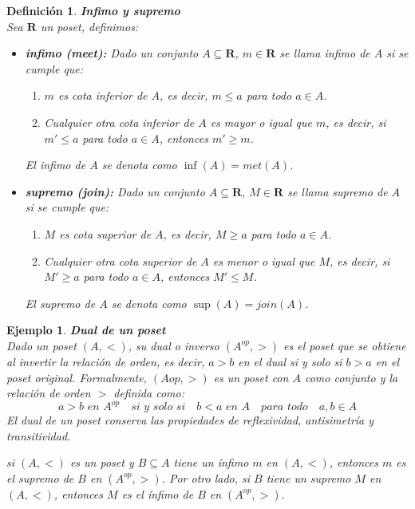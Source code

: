 \documentclass[executivepaper]{article}
\newtheorem{defi}[propo]{Definición}
\newtheorem{ejemplo}[propo]{Ejemplo}
\begin{document}
\begin{defi}\textbf{Infimo y supremo}\\
    Sea $\mathbf{R}$ un poset, definimos:
\begin{itemize}
    \item \textbf{infimo (meet):} Dado un conjunto $A \subseteq \mathbf{R}$, $m \in \mathbf{R}$ se llama infimo de $A$ si se cumple que:
    \begin{enumerate}
        \item $m$ es cota inferior de $A$, es decir, $m \leq a$ para todo $a \in A$.
        \item Cualquier otra cota inferior de $A$ es mayor o igual que $m$, es decir, si $m' \leq a$ para todo $a \in A$, entonces $m' \geq m$.
    \end{enumerate}
    El infimo de $A$ se denota como $\inf(A)=met(A)$.
    \item \textbf{supremo (join):}  Dado un conjunto $A \subseteq \mathbf{R}$, $M \in \mathbf{R}$ se llama supremo de $A$ si se cumple que:
    \begin{enumerate}
        \item $M$ es cota superior de $A$, es decir, $M \geq a$ para todo $a \in A$.
        \item Cualquier otra cota superior de $A$ es menor o igual que $M$, es decir, si $M' \geq a$ para todo $a \in A$, entonces $M' \leq M$.
    \end{enumerate}
    El supremo de $A$ se denota como $\sup(A)=join(A)$.
\end{itemize}    
\end{defi}

\begin{ejemplo}\textbf{Dual de un poset}\\
    Dado un poset $(A,<)$, su dual o inverso $(A^{op},>)$ es el poset que se obtiene al invertir la relación de orden, es decir, $a>b$ en el dual si y solo si $b>a$ en el poset original. Formalmente, $(A{op},>)$ es un poset con $A$ como conjunto y la relación de orden $>$ definida como:
    $$a > b \,\,en\,\,A^{op} \quad si\,\, y\,\, solo\,\, si \quad b < a\,\,en\,\,A \quad para\,\, todo \quad a,b \in A$$
    El dual de un poset conserva las propiedades de reflexividad, antisimetría y transitividad.

    si $(A, <)$ es un poset y $B \subseteq A$ tiene un ínfimo $m$ en $(A, <)$, entonces $m$ es el supremo de $B$ en $(A^{op}, >)$. Por otro lado, si $B$ tiene un supremo $M$ en $(A, <)$, entonces $M$ es el ínfimo de $B$ en $(A^{op}, >)$.
\end{ejemplo}
\end{document}
